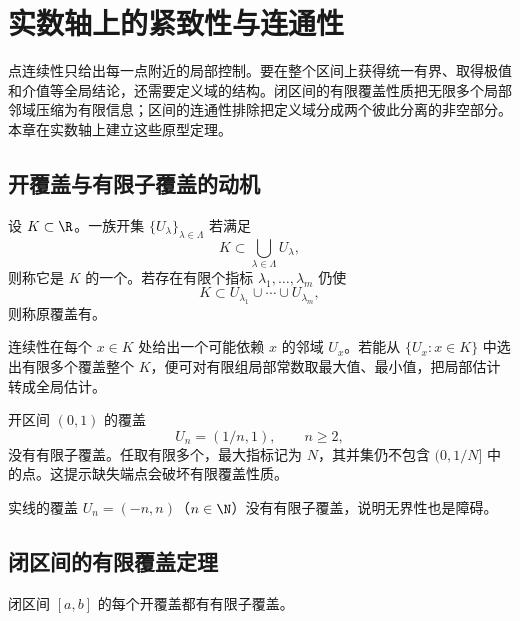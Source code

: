 \chapter{实数轴上的紧致性与连通性}
\label{chap:compact-connected-real-line}

\begin{chapterguide}
点连续性只给出每一点附近的局部控制。要在整个区间上获得统一有界、取得极值和介值等全局结论，还需要定义域的结构。闭区间的有限覆盖性质把无限多个局部邻域压缩为有限信息；区间的连通性排除把定义域分成两个彼此分离的非空部分。本章在实数轴上建立这些原型定理。
\end{chapterguide}

\section{开覆盖与有限子覆盖的动机}

\begin{definition}[开覆盖]
设 \(K\subset\R\)。一族开集 \(\{U_\lambda\}_{\lambda\in\Lambda}\) 若满足
\[
 K\subset\bigcup_{\lambda\in\Lambda}U_\lambda,
\]
则称它是 \(K\) 的一个。若存在有限个指标 \(\lambda_1,\ldots,\lambda_m\) 仍使
\[
 K\subset U_{\lambda_1}\cup\cdots\cup U_{\lambda_m},
\]
则称原覆盖有。
\end{definition}

连续性在每个 \(x\in K\) 处给出一个可能依赖 \(x\) 的邻域 \(U_x\)。若能从 \(\{U_x:x\in K\}\) 中选出有限多个覆盖整个 \(K\)，便可对有限组局部常数取最大值、最小值，把局部估计转成全局估计。

\begin{counterexample}
开区间 \((0,1)\) 的覆盖
\[
 U_n=(1/n,1),\qquad n\ge2,
\]
没有有限子覆盖。任取有限多个，最大指标记为 \(N\)，其并集仍不包含 \((0,1/N]\) 中的点。这提示缺失端点会破坏有限覆盖性质。
\end{counterexample}

\begin{counterexample}
实线的覆盖 \(U_n=(-n,n)\)（\(n\in\N\)）没有有限子覆盖，说明无界性也是障碍。
\end{counterexample}

\section{闭区间的有限覆盖定理}

\begin{theorem}
闭区间 \([a,b]\) 的每个开覆盖都有有限子覆盖。
\end{theorem}


